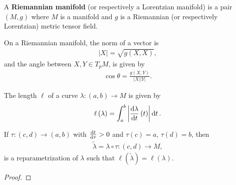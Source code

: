 \begin{definition}
    A \textbf{Riemannian manifold} (or respectively a Lorentzian manifold) is a pair $\left( M,g \right) $ where $M$ is a manifold and $g$ is a Riemannian (or respectively Lorentzian) metric tensor field.
\end{definition}

On a Riemannian manifold, the norm of a vector is
\begin{align}
    \left| X \right| = \sqrt{g \left( X,X \right) } 
,\end{align}
and the angle between $X,Y \in T_p M$, is given by
\begin{align}
    \cos \theta = \frac{g \left( X,Y \right) }{\left| X \right| \left| Y \right| }
.\end{align}

The length $\ell$ of a curve $\lambda : \left( a,b \right) \to M$ is given by
\begin{align}
    \ell \left( \lambda \right)  = \int_a^{b} \left| \dv{\lambda}{t}\left( t \right)  \right| \dd{t}
.\end{align}

\begin{exercise}
    If $\tau : \left( c,d \right) \to \left( a,b \right) $ with $\dv{t}{\tau} > 0$ and $\tau \left( c \right) = a$, $\tau \left( d \right) = b$, then
    \begin{align}
        \widetilde{\lambda} = \lambda \circ \tau : \left( c,d \right) \to M
    ,\end{align}
    is a reparametrization of $\lambda$ such that $\ell \left( \widetilde{\lambda} \right) = \ell \left( \lambda \right) $.
\end{exercise}

\begin{proof}
    
\end{proof}


